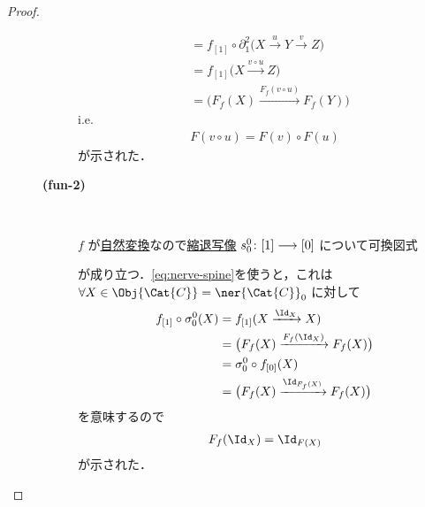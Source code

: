 \documentclass[TQFT_main]{subfiles}
\begin{document}
\begin{proof}
\begin{description}
\begin{description}
\begin{align}
                    &= f_{[1]} \circ \partial_1^2 \bigl( X \xrightarrow{u} Y \xrightarrow{v} Z \bigr) \\
                    &= f_{[1]} \bigl( X \xrightarrow{v \circ u} Z \bigr) \\
                    &= \bigl(F_f(X) \xrightarrow{F_f(v\circ u)} F_f(Y)\bigr)
                \end{align}
                i.e.
                \begin{align}
                    F(v\circ u) = F(v) \circ F(u)
                \end{align}
                が示された．

            \item[\textbf{(fun-2)}]　
            
                $f$ が\hyperref[def:nat]{自然変換}なので\hyperref[def:simplex-cat]{縮退写像} $s_0^0 \colon [1] \longrightarrow [0]$ について可換図式
                \begin{center}
                \end{center}
                が成り立つ．\eqref{eq:nerve-spine}を使うと，これは $\forall X \in \Obj{\Cat{C}} = \ner{\Cat{C}}_0$ に対して
                \begin{align}
                    f_{[1]} \circ \sigma_0^0 (X) 
                    &= f_{[1]} (X \xrightarrow{\Id_X} X) \\
                    &= \bigl(F_f(X) \xrightarrow{F_f(\Id_X)} F_f(X)\bigr) \\
                    &= \sigma_0^0 \circ f_{[0]} (X) \\
                    &= \bigl(F_f(X) \xrightarrow{\Id_{F_f(X)}} F_f(X)\bigr)
                \end{align}
                を意味するので
                \begin{align}
                    F_f(\Id_X) = \Id_{F(X)}
                \end{align}
                が示された．
        \end{description}
    \end{description}
    
\end{proof}
\end{document}

